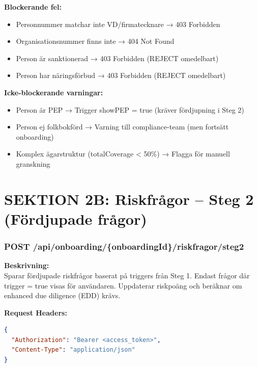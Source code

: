 \documentclass[12pt,a4paper]{article}
\begin{document}
\textbf{Blockerande fel:}
\begin{itemize}[noitemsep]
  \item Personnummer matchar inte VD/firmatecknare → 403 Forbidden
  \item Organisationsnummer finns inte → 404 Not Found
  \item Person är sanktionerad → 403 Forbidden (REJECT omedelbart)
  \item Person har näringsförbud → 403 Forbidden (REJECT omedelbart)
\end{itemize}

\textbf{Icke-blockerande varningar:}
\begin{itemize}[noitemsep]
  \item Person är PEP → Trigger showPEP = true (kräver fördjupning i Steg 2)
  \item Person ej folkbokförd → Varning till compliance-team (men fortsätt onboarding)
  \item Komplex ägarstruktur (totalCoverage < 50\%) → Flagga för manuell granskning
\end{itemize}


\newpage


\section{SEKTION 2B: Riskfrågor – Steg 2 (Fördjupade frågor)}

\subsubsection{POST /api/onboarding/\{onboardingId\}/riskfragor/steg2}

\textbf{Beskrivning:}\\
Sparar fördjupade riskfrågor baserat på triggers från Steg 1. Endast frågor där trigger = true visas för användaren. Uppdaterar riskpoäng och beräknar om enhanced due diligence (EDD) krävs.

\textbf{Request Headers:}
\begin{lstlisting}[language=json]
{
  "Authorization": "Bearer <access_token>",
  "Content-Type": "application/json"
}
\end{lstlisting}
\end{document}
